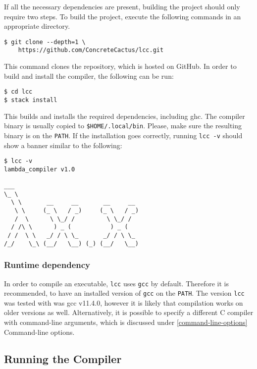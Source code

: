 \documentclass[12pt]{article}
\begin{document}
If all the necessary dependencies are present, building the project should only
require two steps. To build the project, execute the following commands in an
appropriate directory.
\begin{lstlisting}
$ git clone --depth=1 \
    https://github.com/ConcreteCactus/lcc.git
\end{lstlisting}
This command clones the repository, which is hosted on GitHub. In order to build
and install the compiler, the following can be run:
\begin{lstlisting}
$ cd lcc
$ stack install
\end{lstlisting}
This builds and installs the required dependencies, including ghc. The compiler
binary is usually copied to \texttt{\$HOME/.local/bin}. Please, make sure the
resulting binary is on the \texttt{PATH}. If the installation goes correctly,
running \texttt{lcc -v} should show a banner similar to the following:

\vspace{1em}\noindent\begin{minipage}{\textwidth}
\begin{lstlisting}
$ lcc -v
lambda_compiler v1.0

___
\_ \
  \ \       __     __       __     __
   \ \     (_ \   / _)     (_ \   / _)
   /  \      \ \_/ /         \ \_/ /
  / /\ \      ) _ (           ) _ (
 / /  \ \   _/ / \ \_       _/ / \ \_
/_/    \_\ (__/   \__) (_) (__/   \__)
\end{lstlisting}
\end{minipage}

\subsubsection{Runtime dependency}

In order to compile an executable, \texttt{lcc} uses \texttt{gcc} by default.
Therefore it is recommended, to have an installed version of \texttt{gcc} on the
\texttt{PATH}. The version \texttt{lcc} was tested with was gcc v11.4.0, however
it is likely that compilation works on older versions as well. Alternatively, it
is possible to specify a different C compiler with command-line arguments, which
is discussed under \ref{command-line-options} Command-line options.

\subsection{Running the Compiler}
\end{document}

